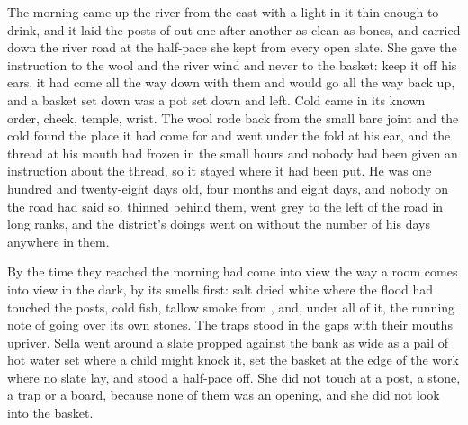 
The morning came up the river from the east with a light in it thin enough to drink, and it laid the posts of  out one after another as clean as bones, and  carried  down the river road at the half-pace she kept from every open slate. She gave the instruction to the wool and the river wind and never to the basket: keep it off his ears, it had come all the way down with them and would go all the way back up, and a basket set down was a pot set down and left. Cold came in its known order, cheek, temple, wrist. The wool rode back from the small bare joint and the cold found the place it had come for and went under the fold at his ear, and the thread at his mouth had frozen in the small hours and nobody had been given an instruction about the thread, so it stayed where it had been put. He was one hundred and twenty-eight days old, four months and eight days, and nobody on the road had said so.  thinned behind them,  went grey to the left of the road in long ranks, and the district's doings went on without the number of his days anywhere in them.

By the time they reached  the morning had come into view the way a room comes into view in the dark, by its smells first: salt dried white where the flood had touched the posts, cold fish, tallow smoke from , and, under all of it, the running note of  going over its own stones. The traps stood in the gaps with their mouths upriver. Sella went around a slate propped against the bank as wide as a pail of hot water set where a child might knock it, set the basket at the edge of the work where no slate lay, and stood a half-pace off. She did not touch  at a post, a stone, a trap or a board, because none of them was an opening, and she did not look into the basket.

